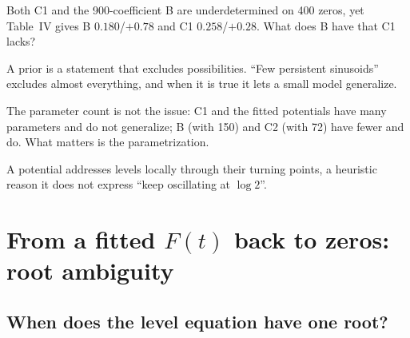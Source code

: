 \begin{checkpoint}
Both C1 and the 900-coefficient B are underdetermined on 400 zeros, yet Table~IV gives B $0.180$/$+0.78$ and C1 $0.258$/$+0.28$. What does B have that C1 lacks?
\end{checkpoint}

\begin{keyideas}
\item A prior is a statement that excludes possibilities. ``Few persistent sinusoids'' excludes almost everything, and when it is true it lets a small model generalize.
\item The parameter count is not the issue: C1 and the fitted potentials have many parameters and do not generalize; B (with 150) and C2 (with 72) have fewer and do. What matters is the parametrization.
\item A potential addresses levels locally through their turning points, a heuristic reason it does not express ``keep oscillating at $\log2$''.
\end{keyideas}

\section{From a fitted $F(t)$ back to zeros: root ambiguity}\label{sec:sparse-frequency-roots}

\subsection{When does the level equation have one root?}

